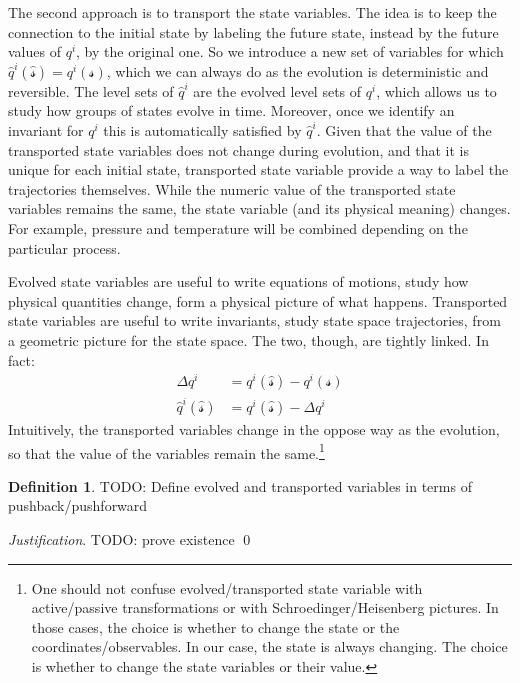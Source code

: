 \documentclass[aps,pra,10pt,twocolumn,floatfix,nofootinbib]{revtex4-1}
\theoremstyle{definition}
\newtheorem{defn}[prop]{Definition}
\newenvironment{justification}{\emph{Justification}.}{\qed}
\begin{document}
The second approach is to transport the state variables. The idea is to keep the connection to the initial state by labeling the future state, instead by the future values of $q^i$, by the original one. So we introduce a new set of variables for which $\hat{q}^i(\hat{\mathcal{s}})=q^i(\mathcal{s})$, which we can always do as the evolution is deterministic and reversible. The level sets of $\hat{q}^i$ are the evolved level sets of $q^i$, which allows us to study how groups of states evolve in time. Moreover, once we identify an invariant for $q^i$ this is automatically satisfied by $\hat{q}^i$. Given that the value of the transported state variables does not change during evolution, and that it is unique for each initial state, transported state variable provide a way to label the trajectories themselves. While the numeric value of the transported state variables remains the same, the state variable (and its physical meaning) changes. For example, pressure and temperature will be combined depending on the particular process.

Evolved state variables are useful to write equations of motions, study how physical quantities change, form a physical picture of what happens. Transported state variables are useful to write invariants, study state space trajectories, from a geometric picture for the state space. The two, though, are tightly linked. In fact:
\begin{align*}
\Delta q^i &= q^i(\hat{\mathcal{s}}) - q^i(\mathcal{s}) \\
\hat{q}^i(\hat{\mathcal{s}}) &= q^i(\hat{\mathcal{s}}) - \Delta q^i
\end{align*}
Intuitively, the transported variables change in the oppose way as the evolution, so that the value of the variables remain the same.\footnote{One should not confuse evolved/transported state variable with active/passive transformations or with Schroedinger/Heisenberg pictures. In those cases, the choice is whether to change the state or the coordinates/observables. In our case, the state is always changing. The choice is whether to change the state variables or their value.}

\begin{defn}\label{evolved_transported_variable}
TODO: Define evolved and transported variables in terms of pushback/pushforward
\end{defn}

\begin{justification}
TODO: prove existence
\end{justification}
\end{document}
